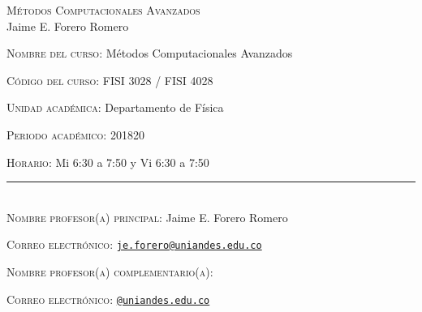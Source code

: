 \documentclass[letterpaper,10pt,onecolumn]{article}
\begin{document}
\begin{center}


\textsc{\LARGE M\'etodos Computacionales Avanzados}\\[0.1cm]

\large Jaime E. Forero Romero\\[0.5cm]

\end{center}

\large \noindent\textsc{Nombre del curso:}  M\'etodos Computacionales
Avanzados%
  
\noindent\textsc{C\'odigo del curso:} FISI 3028 / FISI 4028 %

\noindent\textsc{Unidad acad\'emica:} Departamento de F\'isica

\noindent\textsc{Periodo acad\'emico:} 201820 %

\noindent\textsc{Horario:} Mi 6:30 a 7:50 y Vi 6:30 a 7:50 %

\noindent\rule{\textwidth}{1pt}\\[-0.3cm]

\normalsize \noindent\textsc{Nombre profesor(a) principal:} Jaime
E. Forero Romero%

\noindent\textsc{Correo electr\'onico:}
\href{mailto:je.forero@uniandes.edu.co}{\nolinkurl{je.forero@uniandes.edu.co}}


\noindent\textsc{Nombre profesor(a) complementario(a):} %

\noindent\textsc{Correo electr\'onico:}
\href{mailto:@uniandes.edu.co}{\nolinkurl{@uniandes.edu.co}}


\end{document}
